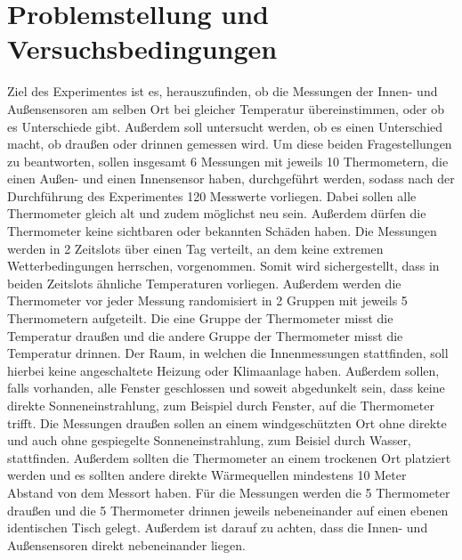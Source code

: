 \documentclass[ ngerman, fontsize= 12pt, paper=a4, headings=big, titlepage=true]{article}
\begin{document}
\section{Problemstellung und Versuchsbedingungen}
Ziel des Experimentes ist es, herauszufinden, ob die Messungen der Innen- und Außensensoren am selben Ort bei gleicher Temperatur übereinstimmen, oder ob es Unterschiede gibt. Außerdem soll untersucht werden, ob es einen Unterschied macht, ob draußen oder drinnen gemessen wird.\newline
Um diese beiden Fragestellungen zu beantworten, sollen insgesamt 6 Messungen mit jeweils 10 Thermometern, die einen Außen- und einen Innensensor haben, durchgeführt werden, sodass nach der Durchführung des Experimentes 120 Messwerte vorliegen. Dabei sollen alle Thermometer gleich alt und zudem möglichst neu sein. Außerdem dürfen die Thermometer keine sichtbaren oder bekannten Schäden haben. Die Messungen werden in 2 Zeitslots über einen Tag verteilt, an dem keine extremen Wetterbedingungen herrschen, vorgenommen. Somit wird sichergestellt, dass in beiden Zeitslots ähnliche Temperaturen vorliegen. Außerdem werden die Thermometer vor jeder Messung randomisiert in 2 Gruppen mit jeweils 5 Thermometern aufgeteilt. Die eine Gruppe der Thermometer misst die Temperatur draußen und die andere Gruppe der Thermometer misst die Temperatur drinnen. Der Raum, in welchen die Innenmessungen stattfinden, soll hierbei keine angeschaltete Heizung oder Klimaanlage haben. Außerdem sollen, falls vorhanden, alle Fenster geschlossen und soweit abgedunkelt sein, dass keine direkte Sonneneinstrahlung, zum Beispiel durch Fenster, auf die Thermometer trifft. \newline
Die Messungen draußen sollen an einem windgeschützten Ort ohne direkte und auch ohne gespiegelte Sonneneinstrahlung, zum Beisiel durch Wasser, stattfinden. Außerdem sollten die Thermometer an einem trockenen Ort platziert werden und es sollten andere direkte Wärmequellen mindestens 10 Meter Abstand von dem Messort haben. \newline
Für die Messungen werden die 5 Thermometer draußen und die 5 Thermometer drinnen jeweils nebeneinander auf einen ebenen identischen Tisch gelegt. Außerdem ist darauf zu achten, dass die Innen- und Außensensoren direkt nebeneinander liegen.  \newline
\end{document}
